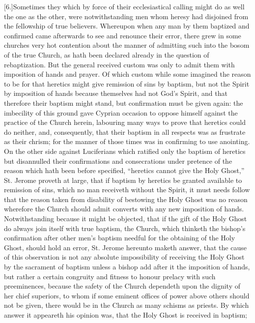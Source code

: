 [6.]Sometimes they which by force of their ecclesiastical calling might do as well the one as the other, were notwithstanding men whom heresy had disjoined from the fellowship of true believers. Whereupon when any man by them baptized and confirmed came afterwards to see and renounce their error, there grew in some churches very hot contention about the manner of admitting such into the bosom of the true Church, as hath been declared already in the question of rebaptization. But the general received custom was only to admit them with imposition of hands and prayer. Of which custom while some imagined the reason to be for that heretics might give remission of sins by baptism, but not the Spirit by imposition of hands because themselves had not God’s Spirit, and that therefore their baptism might stand, but confirmation must be given again: the imbecility of this ground gave Cyprian occasion to oppose himself against the practice of the Church herein, labouring many ways to prove that heretics could do neither, and, consequently, that their  baptism in all respects was as frustrate as their chrism; for the manner of those times was in confirming to use anointing. On the other side against Luciferians which ratified only the baptism of heretics but disannulled their confirmations and consecrations under pretence of the reason which hath been before specified, “heretics cannot give the Holy Ghost,” St. Jerome proveth at large, that if baptism by heretics be granted available to remission of sins, which no man receiveth without the Spirit, it must needs follow that the reason taken from disability of bestowing the Holy Ghost was no reason wherefore the Church should admit converts with any new imposition of hands. Notwithstanding because it might be objected, that if the gift of the Holy Ghost do always join itself with true baptism, the Church, which thinketh the bishop’s confirmation after other men’s baptism needful for the obtaining of the Holy Ghost, should hold an error, St. Jerome hereunto maketh answer, that the cause of this observation is not any absolute impossibility of receiving the Holy Ghost by the sacrament of baptism unless a bishop add after it the imposition of hands, but rather a certain congruity and fitness to honour prelacy with such preeminences, because the safety of the Church dependeth upon the dignity of her chief superiors, to whom if some eminent offices of power above others should not be given, there would be in the Church as many schisms as priests. By which answer it  appeareth his opinion was, that the Holy Ghost is received in baptism;
